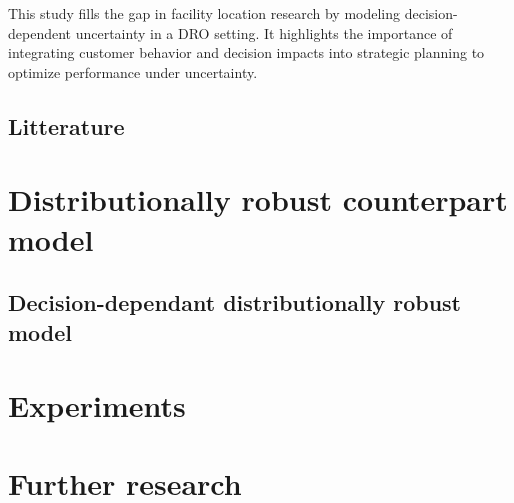 \documentclass[12pt, letterpaper]{article}
\begin{document}
This study fills the gap in facility location research by modeling decision-dependent uncertainty in a DRO setting. It highlights the importance of integrating customer behavior and decision impacts into strategic planning to optimize performance under uncertainty.

	\subsection*{Litterature}
	\section{Distributionally robust counterpart model}
	
	\subsection{Decision-dependant distributionally robust model}
	
	\section{Experiments}
	
	\section{Further research}
	
	
	
\end{document}
